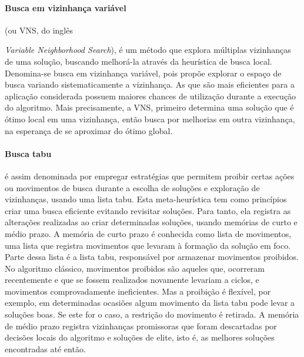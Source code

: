 \documentclass[12pt,a4paper]{article}
\begin{document}
\paragraph{Busca em vizinhança variável} (ou VNS, do inglês {\textit{Variable Neighborhood Search}), é um método que explora múltiplas vizinhanças de uma solução, buscando melhorá-la através da heurística de busca local. Denomina-se busca em vizinhança variável, pois propõe explorar o espaço de busca variando sistematicamente a vizinhança. As que são mais eficientes para a aplicação considerada possuem maiores chances de utilização durante a execução do algoritmo. Mais precisamente, a VNS, primeiro determina uma solução que é ótimo local em uma vizinhança, então busca por melhorias em outra vizinhança, na esperança de se aproximar do ótimo global.

\paragraph{Busca tabu}é assim denominada por empregar estratégias que permitem proibir certas ações ou movimentos de busca durante a escolha de soluções e exploração de vizinhanças, usando uma lista tabu. Esta meta-heurística tem como princípios criar uma busca eficiente evitando revisitar soluções. Para tanto, ela registra as alterações realizadas ao criar determinadas soluções, usando memórias de curto e médio prazo.  A memória de curto prazo é conhecida como lista de movimentos, uma lista que registra movimentos que levaram à formação da solução em foco. Parte dessa lista é a  lista tabu, responsável por armazenar movimentos proibidos. No algoritmo clássico, movimentos proibidos são aqueles que, ocorreram recentemente e que se fossem realizados novamente levariam a ciclos, e movimentos comprovadamente ineficientes. Mas a proibição é flexível, por exemplo, em determinadas ocasiões algum movimento da lista tabu pode levar a soluções boas. Se este for o caso, a restrição do movimento é retirada. A memória de médio prazo registra vizinhanças promissoras que foram descartadas por decisões locais do algoritmo e soluções de elite, isto é, as melhores soluções encontradas até então. 

}
\end{document}
